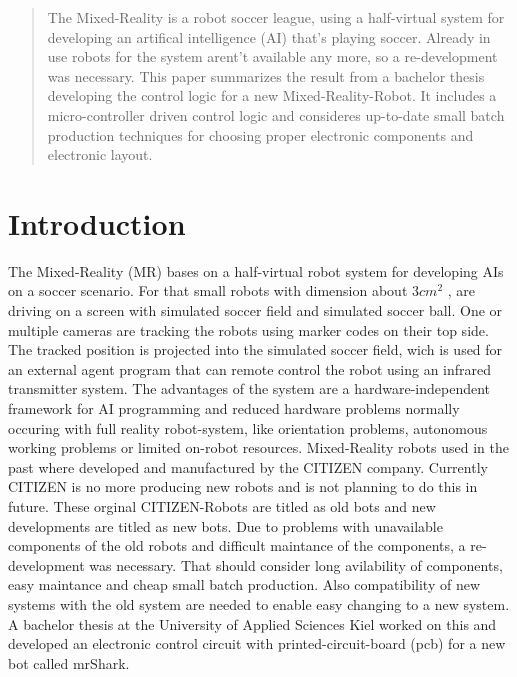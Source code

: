 \documentclass{acm_proc_article-sp}
\begin{document}
\maketitle
\begin{abstract}
The Mixed-Reality is a robot soccer league, using a half-virtual system for
developing an artifical intelligence (AI) that's playing soccer. Already in use
robots for the system arent't available any more, so a re-development was
necessary. This paper summarizes the result from a bachelor thesis developing
the control logic for a new Mixed-Reality-Robot. It includes a micro-controller
driven control logic and consideres up-to-date small batch production
techniques for choosing proper electronic components and electronic layout.
\end{abstract}




\section{Introduction}
The Mixed-Reality (MR) bases on a half-virtual robot system for developing AIs
on a soccer scenario. For that small robots with dimension about
$3cm^{2}$ \cite{northernstars:mrshark}, are driving on a screen with simulated
soccer field and simulated soccer ball. One or multiple cameras are tracking the robots using marker codes on their top side. The tracked position is projected
into the simulated soccer field, wich is used for an external agent program that
can remote control the robot using an infrared transmitter system. The advantages of the system are a hardware-independent
framework for AI programming and reduced hardware problems normally occuring
with full reality robot-system, like orientation problems, autonomous working
problems or limited on-robot resources\cite{northernstars:mr-system}.
\newline
\newline
Mixed-Reality robots used in the past where developed and manufactured by the
CITIZEN company\cite{rtlions:faq}. Currently CITIZEN is no more producing new
robots and is not planning to do this in future. These orginal CITIZEN-Robots are titled as old
bots and new developments are titled as new bots. Due to problems with
unavailable components of the old robots and difficult maintance of the
components, a re-development was necessary. That should consider long
avilability of components, easy maintance and cheap small batch production. Also
compatibility of new systems with the old system are needed to enable easy
changing to a new system. A bachelor thesis at the University of Applied
Sciences Kiel worked on this and developed an electronic control circuit with
printed-circuit-board (pcb) for a new bot called mrShark.
\end{document}
